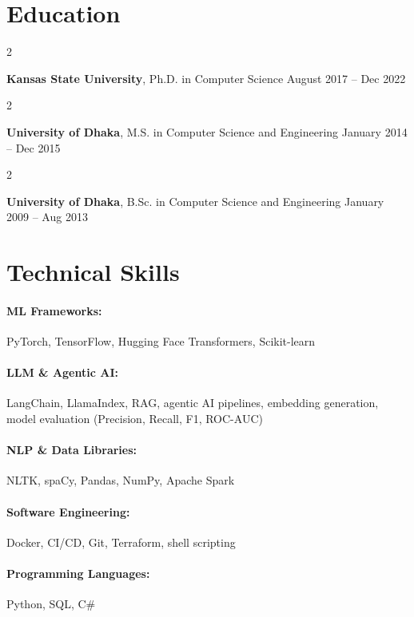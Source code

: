 \documentclass[10pt, letterpaper]{article}
\newenvironment{twocolentry}[2][]{
    \onecolentry
    \def\secondColumn{#2}
    \setcolumnwidth{\fill, 4.5 cm}
    \begin{paracol}{2}
}{
    \switchcolumn \raggedleft \secondColumn
    \end{paracol}
    \endonecolentry
} %
\begin{document}
\section{Education}

        \begin{twocolentry}{
            August 2017 -- Dec 2022
        }
            \textbf{Kansas State University}, Ph.D. in Computer Science\end{twocolentry}

        \begin{twocolentry}{
            January 2014 -- Dec 2015
        }
            \textbf{University of Dhaka}, M.S. in Computer Science and Engineering\end{twocolentry}

        \begin{twocolentry}{
            January 2009 -- Aug 2013
        }
            \textbf{University of Dhaka}, B.Sc. in Computer Science and Engineering\end{twocolentry}

\vspace{-1mm}
\section{Technical Skills}

        \paragraph{ML Frameworks:} PyTorch, TensorFlow, Hugging Face Transformers, Scikit-learn
        \vspace{-4mm}
        \paragraph{LLM \& Agentic AI:} LangChain, LlamaIndex, RAG, agentic AI pipelines, embedding generation, model evaluation (Precision, Recall, F1, ROC-AUC)
        \vspace{-4mm}
        \paragraph{NLP \& Data Libraries:} NLTK, spaCy, Pandas, NumPy, Apache Spark
        \vspace{-4mm}
        \paragraph{Software Engineering:} Docker, CI/CD, Git, Terraform, shell scripting
        \vspace{-4mm}
        \paragraph{Programming Languages:} Python, SQL, C\#
\end{document}
